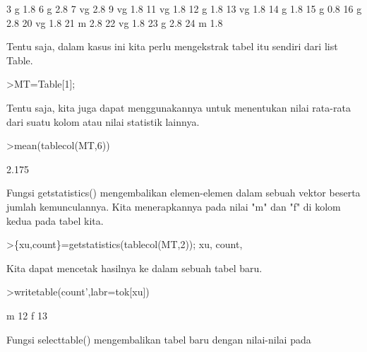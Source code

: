 \documentclass{article}
\newenvironment{eulernotebook}{\par}{\par}
\newenvironment{eulercomment}{\par\medskip}{\par\medskip}
\begin{document}
\begin{eulernotebook}
\begin{euleroutput}
           3          g       1.8
           6          g       2.8
           7         vg       2.8
           9         vg       1.8
          11         vg       1.8
          12          g       1.8
          13         vg       1.8
          14          g       1.8
          15          g       0.8
          16          g       2.8
          20         vg       1.8
          21          m       2.8
          22         vg       1.8
          23          g       2.8
          24          m       1.8
\end{euleroutput}
\begin{eulercomment}
Tentu saja, dalam kasus ini kita perlu mengekstrak tabel itu sendiri
dari list Table.
\end{eulercomment}
\begin{eulerprompt}
>MT=Table[1];
\end{eulerprompt}
\begin{eulercomment}
Tentu saja, kita juga dapat menggunakannya untuk menentukan nilai
rata-rata dari suatu kolom atau nilai statistik lainnya.
\end{eulercomment}
\begin{eulerprompt}
>mean(tablecol(MT,6))
\end{eulerprompt}
\begin{euleroutput}
  2.175
\end{euleroutput}
\begin{eulercomment}
Fungsi getstatistics() mengembalikan elemen-elemen dalam sebuah vektor
beserta jumlah kemunculannya. Kita menerapkannya pada nilai "m" dan
"f" di kolom kedua pada tabel kita.
\end{eulercomment}
\begin{eulerprompt}
>\{xu,count\}=getstatistics(tablecol(MT,2)); xu, count,
\end{eulerprompt}
\begin{euleroutput}
  [1,  3]
  [12,  13]
\end{euleroutput}
\begin{eulercomment}
Kita dapat mencetak hasilnya ke dalam sebuah tabel baru.
\end{eulercomment}
\begin{eulerprompt}
>writetable(count',labr=tok[xu])
\end{eulerprompt}
\begin{euleroutput}
           m        12
           f        13
\end{euleroutput}
\begin{eulercomment}
Fungsi selecttable() mengembalikan tabel baru dengan nilai-nilai pada

\end{eulercomment}
\end{eulernotebook}
\end{document}
